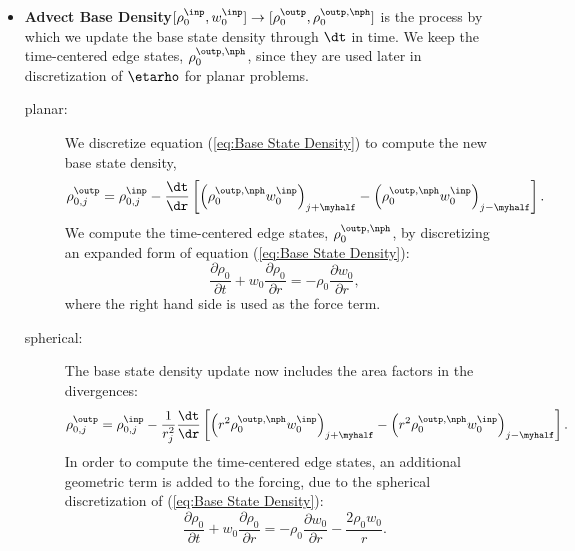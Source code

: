 \begin{itemize}
\item {\bf Advect Base Density}$[\rho_0^\inp,w_0^\inp] \rightarrow
  [\rho_0^\outp, \rho_0^{\outp,\nph}]$ is the process by which we
  update the base state density through $\dt$ in time.  We keep the
  time-centered edge states, $\rho_0^{\outp,\nph}$,
  since they are used later in discretization of $\etarho$ for planar problems.
\begin{description}
\item[planar:] We discretize equation (\ref{eq:Base State Density}) to
  compute the new base state density,
\begin{equation}
\rho_{0,j}^{\outp} = \rho_{0,j}^{\inp} - \frac{\dt}{\dr} \left [ \left( \rho_0^{\outp,\nph} w_0^{\inp}\right)_{j+\myhalf} - \left( \rho_0^{\outp,\nph} w_0^{\inp}\right)_{j-\myhalf} \right ].
\end{equation}
  We compute the time-centered edge states, $\rho_0^{\outp,\nph}$,
  by discretizing an expanded form of equation (\ref{eq:Base State Density}):
\begin{equation}
\frac{\partial \rho_0}{\partial t} + w_0 \frac{\partial \rho_0}{\partial r} = - \rho_0 \frac{\partial w_0}{\partial r},
\end{equation}
  where the right hand side is used as the force term.
\item[spherical:] The base state density update now includes the area factors in the 
  divergences:
\begin{equation}
\rho_{0,j}^{\outp} = \rho_{0,j}^{\inp} - \frac{1}{r_j^2} \frac{\dt}{\dr} \left [ \left( r^2 \rho_0^{\outp,\nph} w_0^{\inp}\right)_{j+\myhalf} - \left( r^2 \rho_0^{\outp,\nph} w_0^{\inp}\right)_{j-\myhalf} \right].
\end{equation}
  In order to compute the time-centered edge states, an additional geometric 
  term is added to the forcing, due to the spherical discretization of 
  (\ref{eq:Base State Density}):
\begin{equation}
\frac{\partial \rho_0}{\partial t} + w_0 \frac{\partial \rho_0}{\partial r} = - \rho_0 \frac{\partial w_0}{\partial r} - \frac{2 \rho_0 w_0}{r}.
\end{equation}
\end{description}


\end{itemize}
